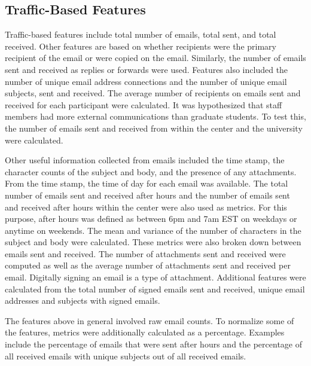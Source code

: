 \documentclass[12pt]{report}
\begin{document}
\subsection{Traffic-Based Features}
Traffic-based features include total number of emails, total sent, and total received.
Other features are based on whether recipients were the primary recipient of the email or were copied on the email.
Similarly, the number of emails sent and received as replies or forwards were used.
Features also included the number of unique email address connections and the number of unique email subjects, sent and received.
The average number of recipients on emails sent and received for each participant were calculated.
It was hypothesized that staff members had more external communications than graduate students.
To test this, the number of emails sent and received from within the center and the university were calculated.  

Other useful information collected from emails included the time stamp, the character counts of the subject and body, and the presence of any attachments.
From the time stamp, the time of day for each email was available.
The total number of emails sent and received after hours and the number of emails sent and received after hours within the center were also used as metrics.
For this purpose, after hours was defined as between 6pm and 7am EST on weekdays or anytime on weekends.
The mean and variance of the number of characters in the subject and body were calculated.
These metrics were also broken down between emails sent and received.
The number of attachments sent and received were computed as well as the average number of attachments sent and received per email.
Digitally signing an email is a type of attachment.
Additional features were calculated from the total number of signed emails sent and received, unique email addresses and subjects with signed emails.

The features above in general involved raw email counts.
To normalize some of the features, metrics were additionally calculated as a percentage.
Examples include the percentage of emails that were sent after hours and the percentage of all received emails with unique subjects out of all received emails.
\end{document}
